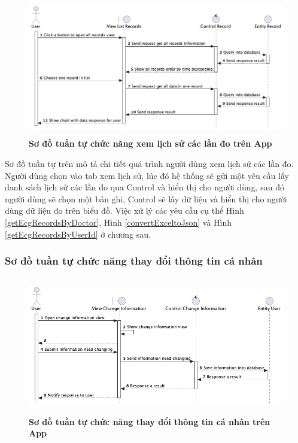     \begin{figure}[H]
         \centering
         \includegraphics[width=12cm,height=6cm]{Images/mobile_app/view_record_timeline.png}
         \caption[Sơ đồ tuần tự chức năng xem lịch sử các lần đo trên App]{\bfseries \fontsize{12pt}{0pt}
         \selectfont Sơ đồ tuần tự chức năng xem lịch sử các lần đo trên App}
         \label{view_record_timeline} %
    \end{figure}

    Sơ đồ tuần tự trên mô tả chi tiết quá trình người dùng xem lịch sử các lần đo. Người dùng chọn vào tab xem lịch sử, 
    lúc đó hệ thống sẽ gửi một yêu cầu lấy danh sách lịch sử các lần đo qua Control và hiển thị cho người dùng, sau đó người dùng sẽ
    chọn một bản ghi, Control sẽ lấy dữ liệu và hiển thị cho người dùng dữ liệu đo trên biểu đồ. Việc xử lý các yêu cầu cụ thể
    Hình \ref{getEcgRecordsByDoctor}, Hình \ref{convertExceltoJson} và Hình \ref{getEcgRecordsByUserId} ở chương sau.

\subsubsection{Sơ đồ tuần tự chức năng thay đổi thông tin cá nhân}

  \begin{figure}[H]
        \centering
        \includegraphics[width=12cm,height=6cm]{Images/mobile_app/change_user_information.png}
        \caption[Sơ đồ tuần tự chức năng thay đổi thông tin cá nhân trên App]{\bfseries \fontsize{12pt}{0pt}
        \selectfont Sơ đồ tuần tự chức năng thay đổi thông tin cá nhân trên App}
        \label{change_user_information} %
  \end{figure}

